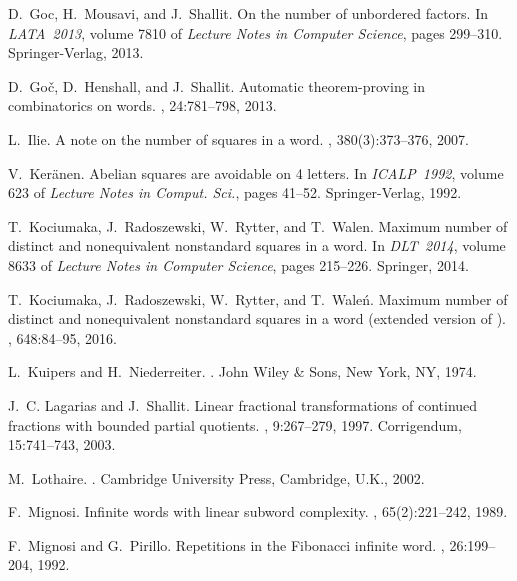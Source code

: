 \documentclass[11pt,reqno]{amsart}
\numberwithin{equation}{section}
\theoremstyle{plain}
\theoremstyle{definition}
\theoremstyle{remark}
\begin{document}
\begin{thebibliography}{10}
D.~Goc, H.~Mousavi, and J.~Shallit.
\newblock On the number of unbordered factors.
\newblock In {\em LATA~2013}, volume 7810 of {\em Lecture Notes in Computer
  Science}, pages 299--310. Springer-Verlag, 2013.

D.~{Go\v{c}}, D.~Henshall, and J.~Shallit.
\newblock Automatic theorem-proving in combinatorics on words.
, 24:781--798, 2013.

L.~Ilie.
\newblock A note on the number of squares in a word.
, 380(3):373--376, 2007.

V.~Ker\"{a}nen.
\newblock Abelian squares are avoidable on 4 letters.
\newblock In {\em ICALP~1992}, volume 623 of {\em Lecture Notes in Comput.
  Sci.}, pages 41--52. Springer-Verlag, 1992.

T.~Kociumaka, J.~Radoszewski, W.~Rytter, and T.~Walen.
\newblock Maximum number of distinct and nonequivalent nonstandard squares in a
  word.
\newblock In {\em DLT~2014}, volume 8633 of {\em Lecture Notes in Computer
  Science}, pages 215--226. Springer, 2014.

T.~Kociumaka, J.~Radoszewski, W.~Rytter, and T.~Wale{\'n}.
\newblock Maximum number of distinct and nonequivalent nonstandard squares in a
  word (extended version of \cite{Ry14}).
, 648:84--95, 2016.

L.~Kuipers and H.~Niederreiter.
.
\newblock John Wiley \& Sons, New York, NY, 1974.

J.~C. Lagarias and J.~Shallit.
\newblock Linear fractional transformations of continued fractions with bounded
  partial quotients.
, 9:267--279, 1997.
\newblock Corrigendum, 15:741--743, 2003.

M.~Lothaire.
.
\newblock Cambridge University Press, Cambridge, U.K., 2002.

F.~Mignosi.
\newblock Infinite words with linear subword complexity.
, 65(2):221--242, 1989.

F.~Mignosi and G.~Pirillo.
\newblock Repetitions in the {F}ibonacci infinite word.
, 26:199--204, 1992.


\end{thebibliography}
\end{document}

